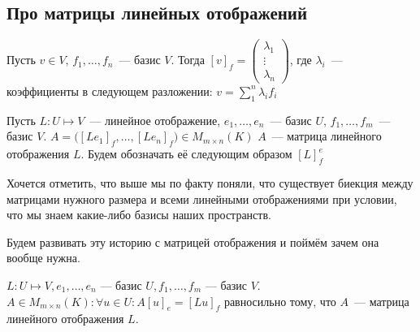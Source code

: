 \subsection{Про матрицы линейных отображений}
\begin{definition}
    Пусть $v\in V$,  $f_1,\dots, f_n$~--- базис $V$.
    Тогда $[v]_f =
    \begin{pmatrix}
        \lambda_1\\ \vdots\\ \lambda_n
    \end{pmatrix}$, где $\lambda_i$~--- коэффициенты в следующем разложении:
    $v = \sum\limits_{1}^{n}{\lambda_if_i}$
\end{definition}
\begin{definition}
    Пусть $L: U\mapsto V$~--- линейное отображение, $e_1,\dots, e_n$~--- базис $U$, 
    $f_1,\dots, f_m$~--- базис $V$. $A = \Big([Le_1]_f, \dots, [Le_n]_f\Big)\in M_{m\times n}(K)$
    $A$~--- матрица линейного отображения $L$. Будем обозначать её следующим образом $[L]_f^e$
\end{definition}
\begin{remark}
    Хочется отметить, что выше мы по факту поняли, что существует биекция между
    матрицами нужного размера и всеми линейными отображениями при условии, что мы
    знаем какие-либо базисы наших пространств.
\end{remark}
\begin{motivation}
    Будем развивать эту историю с матрицей отображения и поймём зачем она вообще нужна.
\end{motivation}
\begin{statement}
    $L: U\mapsto V, e_1,\dots, e_n\text{~--- базис }U, f_1,\dots, f_m\text{~--- базис }V$.
    $A \in M_{m\times n}(K)\colon \forall u\in U\colon A[u]_e = [Lu]_f$ равносильно тому,
    что $A$~--- матрица линейного отображения $L$.
\end{statement}
